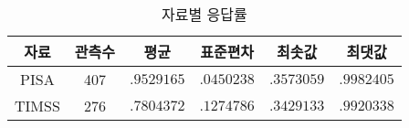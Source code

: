 \begin{table}[htbp]\centering
\def\sym#1{\ifmmode^{#1}\else\(^{#1}\)\fi}
\caption{자료별 응답률 \label{tab:pnt_response}}
\begin{tabular}{c|ccccc} 
자료 & 관측수 & 평균 & 표준편차 & 최솟값 & 최댓값 \\
\hline PISA & 407 & $.9529165$ & $.0450238$ & $.3573059$ & $.9982405$ \\
TIMSS & 276 & $.7804372$ & $.1274786$ & $.3429133$ & $.9920338$
\end{tabular}
\end{table}